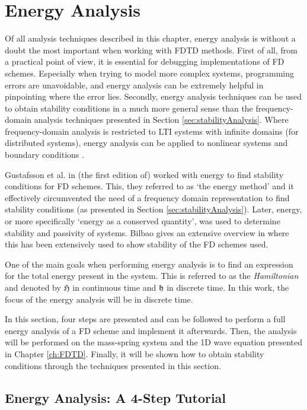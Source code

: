 {{\section{Energy Analysis}\label{sec:energyAnalysis}
Of all analysis techniques described in this chapter, energy analysis is without a doubt the most important when working with FDTD methods. 
First of all, from a practical point of view, it is essential for debugging implementations of FD schemes. Especially when trying to model more complex systems, programming errors are unavoidable, and energy analysis can be extremely helpful in pinpointing where the error lies. 
Secondly, energy analysis techniques can be used to obtain stability conditions in a much more general sense than the frequency-domain analysis techniques presented in Section \ref{sec:stabilityAnalysis}. Where frequency-domain analysis is restricted to LTI systems with infinite domains (for distributed systems), energy analysis can be applied to nonlinear systems and boundary conditions \cite{theBible}. 

Gustafsson et al. in (the first edition of) \cite{Gustafsson2013} worked with energy to find stability conditions for FD schemes. This, they referred to as `the energy method' and it effectively circumvented the need of a frequency domain representation to find stability conditions (as presented in Section \ref{sec:stabilityAnalysis}). Later, energy, or more specifically `energy as a conserved quantity', was used to determine stability and passivity of systems. Bilbao gives an extensive overview in \cite{theBible} where this has been extensively used to show stability of the FD schemes used. 

One of the main goals when performing energy analysis is to find an expression for the total energy present in the system. This is referred to as the \textit{Hamiltonian} and denoted by $\mathfrak{H}$ in continuous time and $\mathfrak{h}$ in discrete time. In this work, the focus of the energy analysis will be in discrete time. %

In this section, four steps are presented and can be followed to perform a full energy analysis of a FD scheme and implement it afterwards. Then, the analysis will be performed on the mass-spring system and the 1D wave equation presented in Chapter \ref{ch:FDTD}. Finally, it will be shown how to obtain stability conditions through the techniques presented in this section. 

\subsection{Energy Analysis: A 4-Step Tutorial}

}}
